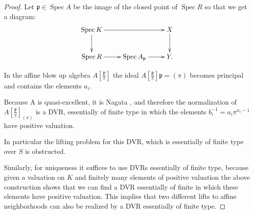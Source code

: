 \documentclass[a4paper]{amsart}
\numberwithin{equation}{section}
\theoremstyle{plain}
\theoremstyle{definition}
\DeclareMathOperator{\Spec}{Spec}
\def\cp{\mathfrak{p}}
\begin{document}
\begin{proof}
	Let $\cp \in \Spec A$ be the image of the closed point of $\Spec R$ so that we get a diagram:
	$$\xymatrix{ \Spec K \ar[d] \ar[rr] & &  X \ar[d] \\ \Spec R \ar[r] &  \Spec A_{\cp} \ar[r] & Y.}$$ 
	
	In the affine blow up algebra $A[\frac{\cp}{\pi}]$ the ideal $A[\frac{\cp}{\pi}] \cp = (\pi)$ becomes principal and contains the elements $a_i$.
	
	{Because A is quasi-excellent, it is Nagata \cite[Tag 07QV]{stacks-project}, and therefore }the normalization of $A[\frac{\cp}{\pi}]_{(\pi)}$ is a DVR, essentially of finite type in which the elements $b_i^{-1}=a_i\pi^{n_i-1}$ have positive valuation.
	
	In particular the lifting problem for this DVR, which is essentially of finite type over $S$ is obstructed.
	
	Similarly, for uniqueness it suffices to use DVRs essentially of finite type, because given a valuation on $K$ and finitely many elements of positive valuation the above construction shows that we can find a DVR essentially of finite in which these elements have positive valuation. This implies that two different lifts to affine neighborhoods can also be realized by a DVR essentially of finite type.
\end{proof}



\end{document}
